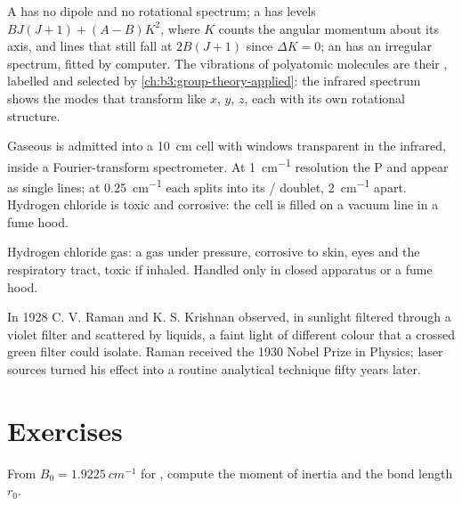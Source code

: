 A  has no dipole and no rotational spectrum; a  has
levels $BJ(J+1) + (A - B)K^2$, where $K$ counts the angular momentum about its axis,
and lines that still fall at $2B(J+1)$ since $\Delta K = 0$; an 
has an irregular spectrum, fitted by computer. The vibrations of polyatomic
molecules are their , labelled and selected by
\cref{ch:b3:group-theory-applied}: the infrared spectrum shows the modes
that transform like $x$, $y$, $z$, each with its own rotational structure.

\begin{inthelab}
Gaseous  is admitted into a \qty{10}{cm} cell with windows transparent in
the infrared, inside a Fourier-transform spectrometer. At \qty{1}{cm^{-1}}
resolution the P and  appear as single lines; at \qty{0.25}{cm^{-1}} each
splits into its / doublet, \qty{2}{cm^{-1}} apart. Hydrogen
chloride is toxic and corrosive: the cell is filled on a vacuum line in a fume
hood.
\end{inthelab}

\begin{safety}{}
Hydrogen chloride gas: a gas under pressure, corrosive to skin, eyes and the
respiratory tract, toxic if inhaled. Handled only in closed apparatus or a
fume hood.
\end{safety}

\begin{history}[Raman, 1928]
In 1928 C. V. Raman and K. S. Krishnan observed, in sunlight filtered through
a violet filter and scattered by liquids, a faint light of different colour
that a crossed green filter could isolate. Raman received the 1930 Nobel
Prize in Physics; laser sources turned his effect into a routine analytical
technique fifty years later.
\end{history}

\section{Exercises}

\begin{exercise}[$\star$]\label{exo:b3:rovibrational-spectroscopy:1}
From $B_0 = \qty{1.9225}{cm^{-1}}$ for , compute the moment of inertia
and the bond length $r_0$.
\end{exercise}

